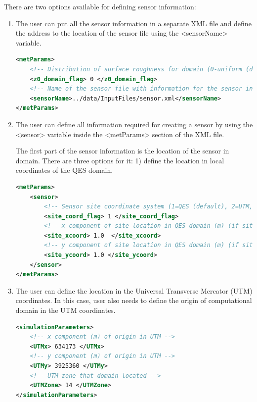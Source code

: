 There are two options available for defining sensor information:

\begin{enumerate}

\item The user can put all the sensor information in a separate XML file and define the address to the location of the sensor file using the <sensorName> variable.

\begin{lstlisting}[language=XML]
<metParams>
	<!-- Distribution of surface roughness for domain (0-uniform (default), 1-custom -->
	<z0_domain_flag> 0 </z0_domain_flag>        
	<!-- Name of the sensor file with information for the sensor included -->   			
	<sensorName>../data/InputFiles/sensor.xml</sensorName>	
</metParams>
\end{lstlisting}
\noindent

\item The user can define all information required for creating a sensor by using the <sensor> variable inside the <metParams> section of the XML file.

The first part of the sensor information is the location of the sensor in domain. There are three options for it: 1) define the location in local coordinates of the QES domain.

\begin{lstlisting}[language=XML]
<metParams>
	<sensor>
		<!-- Sensor site coordinate system (1=QES (default), 2=UTM, 3=Lat/Lon) -->
		<site_coord_flag> 1 </site_coord_flag> 			
		<!-- x component of site location in QES domain (m) (if site_coord_flag = 1) -->
		<site_xcoord> 1.0  </site_xcoord> 
		<!-- y component of site location in QES domain (m) (if site_coord_flag = 1)-->
		<site_ycoord> 1.0 </site_ycoord>
	</sensor>
</metParams>
\end{lstlisting}
\noindent

\item The user can define the location in the Universal Transverse Mercator (UTM) coordinates. In this case, user also needs to define the origin of computational domain in the UTM coordinates.

\begin{lstlisting}[language=XML]
<simulationParameters>
	<!-- x component (m) of origin in UTM -->
	<UTMx> 634173 </UTMx> 	
	<!-- y component (m) of origin in UTM -->					
	<UTMy> 3925360 </UTMy>
	<!-- UTM zone that domain located --> 						
	<UTMZone> 14 </UTMZone> 						
</simulationParameters>
\end{lstlisting}


\end{enumerate}
